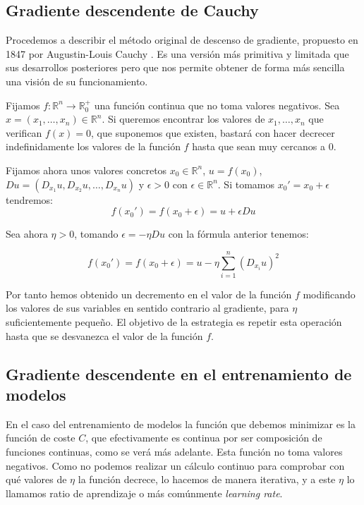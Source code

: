 \subsection{Gradiente descendente de Cauchy}

Procedemos a describir el método original de descenso de gradiente, propuesto en 1847 por Augustin-Louis Cauchy \cite{CauchyGD}. Es una versión más primitiva y limitada que sus desarrollos posteriores pero que nos permite obtener de forma más sencilla una visión de su funcionamiento. 

Fijamos $f:\mathbb{R}^n \rightarrow \mathbb{R}_{0}^{+}$ una función continua que no toma valores negativos. Sea $x= \left ( x_1,\ldots,x_n \right ) \in \mathbb{R}^n$. Si queremos encontrar los valores de $x_1,\ldots,x_n$ que verifican $f(x)=0$, que suponemos que existen, bastará con hacer decrecer indefinidamente los valores de la función $f$ hasta que sean muy cercanos a $0$. 

Fijamos ahora unos valores concretos $x_0 \in \mathbb{R}^n$, $u=f(x_0)$,\\ $Du= \left ( D_{x_1}u, D_{x_2}u, \ldots, D_{x_n}u \right )$ y $\epsilon >0$ con $\epsilon \in \mathbb{R}^n$. Si tomamos $x_0'=x_0+\epsilon$ tendremos:
$$f(x_0')= f(x_0 + \epsilon) = u + \epsilon Du$$

Sea ahora $\eta >0$, tomando $\epsilon= - \eta Du$ con la fórmula anterior tenemos: 

$$f(x_0') = f(x_0 + \epsilon) = u - \eta \sum_{i=1}^{n}(D_{x_i}u)^2$$

Por tanto hemos obtenido un decremento en el valor de la función $f$ modificando los valores de sus variables en sentido contrario al gradiente, para $\eta$ suficientemente pequeño. El objetivo de la estrategia es repetir esta operación hasta que se desvanezca el valor de la función $f$.




\subsection{Gradiente descendente en el entrenamiento de modelos}

En el caso del entrenamiento de modelos la función que debemos minimizar es la función de coste $C$, que efectivamente es continua por ser composición de funciones continuas, como se verá más adelante. Esta función no toma valores negativos. Como no podemos realizar un cálculo continuo para comprobar con qué valores de $\eta$ la función decrece, lo hacemos de manera iterativa, y a este $\eta$ lo llamamos ratio de aprendizaje o más comúnmente \textit{learning rate}. 

